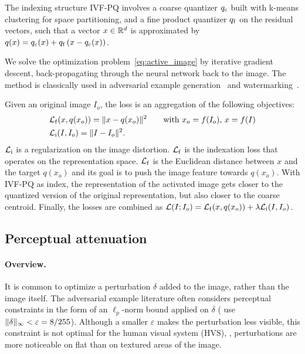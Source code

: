 The indexing structure IVF-PQ involves a coarse quantizer $q_\mathrm{c}$ built with k-means clustering for space partitioning, and a fine product quantizer $q_\mathrm{f}$ on the residual vectors, such that a vector $x \in \mathbb{R}^d$ is approximated by $q(x) = q_\mathrm{c}(x) + q_\mathrm{f}\left( x-q_\mathrm{c}(x) \right)$.

We solve the optimization problem~\eqref{eq:active_image} by iterative gradient descent, back-propagating through the neural network back to the image.
The method is classically used in adversarial example generation~\citep{szegedy2013intriguing, carlini2017c&w} and watermarking~\citep{vukotic2020classification, fernandez2022sslwatermarking}.

Given an original image $I_o$, the loss is an aggregation of the following objectives: 
\begin{align} \label{eq:objective}
    & \mathcal{L}_{\mathrm{f}}(x,q(x_o)) = \lVert{x - q(x_o)}\rVert^2
    \textrm{\qquad  with } x_o = f(I_o) ,\, x = f(I) \\
    & \mathcal{L}_{\mathrm{i}}(I,I_o) = \lVert{I - I_o}\rVert^2.
\end{align}
$\mathcal{L}_{\mathrm{i}}$ is a regularization on the image distortion.
$\mathcal{L}_{\mathrm{f}}$ is the indexation loss that operates on the representation space.
$\mathcal{L}_{\mathrm{f}}$ is the Euclidean distance between $x$ and the target $q(x_o)$ and its goal is to push the image feature towards $q(x_o)$.
With IVF-PQ as index, the representation of the activated image gets closer to the quantized version of the original representation, but also closer to the coarse centroid.
Finally, the losses are combined as 
$\mathcal{L}(I;I_o) = \mathcal{L}_{\mathrm{f}}(x,q(x_o)) + \lambda \mathcal{L}_{\mathrm{i}}(I,I_o)$.





\subsection{Perceptual attenuation} 


\paragraph*{Overview.}
It is common to optimize a perturbation $\delta$ added to the image, rather than the image itself. 
The adversarial example literature often considers perceptual constraints in the form of an $\ell_p$-norm bound applied on $\delta$ (\citet{madry2017towards} use $\lVert{\delta}\rVert_\infty < \varepsilon = 8/255$).
Although a smaller $\varepsilon$ makes the perturbation less visible, this constraint is not optimal for the human visual system (HVS), \eg, perturbations are more noticeable on flat than on textured areas of the image.

